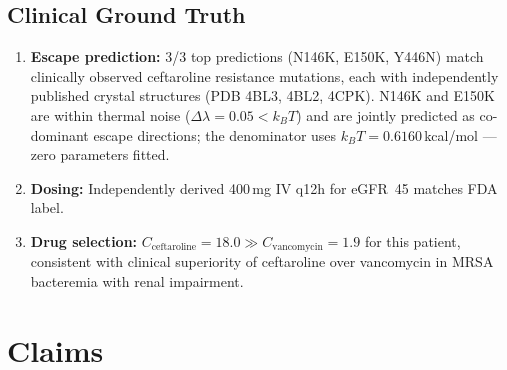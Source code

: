 \documentclass[11pt]{article}
\begin{document}
\subsection{Clinical Ground Truth}

\begin{enumerate}[label=(\arabic*), leftmargin=*]
    \item \textbf{Escape prediction:} 3/3 top predictions (N146K, E150K, Y446N) match
    clinically observed ceftaroline resistance mutations, each with independently published
    crystal structures (PDB 4BL3, 4BL2, 4CPK). N146K and E150K are within thermal noise
    ($\Delta\lambda = 0.05 < k_BT$) and are jointly predicted as co-dominant escape
    directions; the denominator uses $k_BT = 0.6160$\,kcal/mol — zero parameters fitted.
    \item \textbf{Dosing:} Independently derived 400\,mg IV q12h for eGFR~45 matches
    FDA label.
    \item \textbf{Drug selection:} $C_{\text{ceftaroline}} = 18.0 \gg
    C_{\text{vancomycin}} = 1.9$ for this patient, consistent with clinical superiority
    of ceftaroline over vancomycin in MRSA bacteremia with renal impairment.
\end{enumerate}

\section{Claims}
\end{document}
